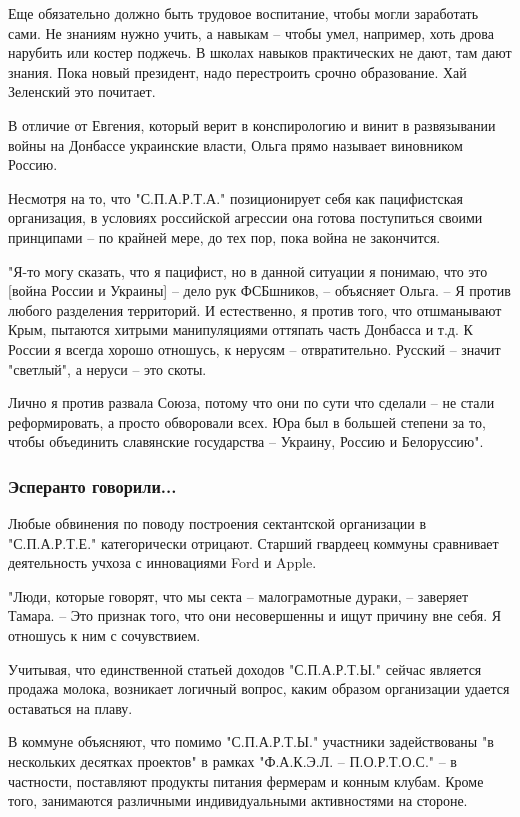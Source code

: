 Еще обязательно должно быть трудовое воспитание, чтобы могли заработать сами.
Не знаниям нужно учить, а навыкам – чтобы умел, например, хоть дрова нарубить
или костер поджечь. В школах навыков практических не дают, там дают знания.
Пока новый президент, надо перестроить срочно образование. Хай Зеленский это
почитает.

В отличие от Евгения, который верит в конспирологию и винит в развязывании
войны на Донбассе украинские власти, Ольга прямо называет виновником Россию. 

Несмотря на то, что "С.П.А.Р.Т.А." позиционирует себя как пацифистская
организация, в условиях российской агрессии она готова поступиться своими
принципами – по крайней мере, до тех пор, пока война не закончится.

"Я-то могу сказать, что я пацифист, но в данной ситуации я понимаю, что это
[война России и Украины] – дело рук ФСБшников, – объясняет Ольга. – Я против
любого разделения территорий. И естественно, я против того, что отшманывают
Крым, пытаются хитрыми манипуляциями оттяпать часть Донбасса и т.д. К России я
всегда хорошо отношусь, к нерусям – отвратительно. Русский – значит "светлый",
а неруси – это скоты. 

Лично я против развала Союза, потому что они по сути что сделали – не стали
реформировать, а просто обворовали всех. Юра был в большей степени за то, чтобы
объединить славянские государства – Украину, Россию и Белоруссию".

\subsubsection{Эсперанто говорили...}

Любые обвинения по поводу построения сектантской организации в "С.П.А.Р.Т.Е."
категорически отрицают. Старший гвардеец коммуны сравнивает деятельность учхоза
с инновациями Ford и Apple.

"Люди, которые говорят, что мы секта – малограмотные дураки, – заверяет Тамара.
– Это признак того, что они несовершенны и ищут причину вне себя. Я отношусь к
ним с сочувствием.

Учитывая, что единственной статьей доходов "С.П.А.Р.Т.Ы." сейчас является
продажа молока, возникает логичный вопрос, каким образом организации удается
оставаться на плаву. 

В коммуне объясняют, что помимо "С.П.А.Р.Т.Ы." участники задействованы "в
нескольких десятках проектов" в рамках "Ф.А.К.Э.Л. – П.О.Р.Т.О.С." – в
частности, поставляют продукты питания фермерам и конным клубам. Кроме того,
занимаются различными индивидуальными активностями на стороне.

